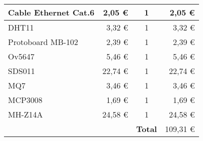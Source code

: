 \begin{table}[H]
\begin{tabular}{lrc|r|}
		\multicolumn{1}{|l|}{Cable   Ethernet Cat.6}                       & \multicolumn{1}{r|}{2,05 €}                                                          & 1                                   & 2,05 €                                                                               \\ \hline
		\multicolumn{1}{|l|}{DHT11}                                        & \multicolumn{1}{r|}{3,32 €}                                                          & 1                                   & 3,32 €                                                                               \\ \hline
		\multicolumn{1}{|l|}{Protoboard MB-102}                            & \multicolumn{1}{r|}{2,39 €}                                                          & 1                                   & 2,39 €                                                                               \\ \hline
		\multicolumn{1}{|l|}{Ov5647}                                       & \multicolumn{1}{r|}{5,46 €}                                                          & 1                                   & 5,46 €                                                                               \\ \hline
		\multicolumn{1}{|l|}{SDS011}                                       & \multicolumn{1}{r|}{22,74 €}                                                         & 1                                   & 22,74 €                                                                              \\ \hline
		\multicolumn{1}{|l|}{MQ7}                                          & \multicolumn{1}{r|}{3,46 €}                                                          & 1                                   & 3,46 €                                                                               \\ \hline
		\multicolumn{1}{|l|}{MCP3008}                                      & \multicolumn{1}{r|}{1,69 €}                                                          & 1                                   & 1,69 €                                                                               \\ \hline
		\multicolumn{1}{|l|}{MH-Z14A}                                      & \multicolumn{1}{r|}{24,58 €}                                                         & 1                                   & 24,58 €                                                                              \\ \hline
		\multicolumn{1}{r}{\textbf{}}                                      & \multicolumn{1}{l}{}                                                                 & \multicolumn{1}{r|}{\textbf{Total}} & 109,31 €                                                                             \\ \cline{4-4}
	\end{tabular}
\end{table}

